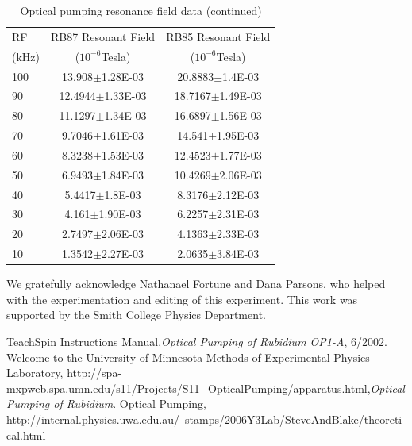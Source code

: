 \documentclass[prb,preprint]{revtex4-1}
\begin{document}
\vspace*{-5cm}
\begin{table}[h]
\centering
\caption{Optical pumping resonance field data (continued)}
\begin{ruledtabular}
\begin{tabular}{ l c c}
RF & RB87 Resonant Field & RB85 Resonant Field\\
(kHz) & ($10^{-6}$Tesla) & ($10^{-6}$Tesla)\\
\hline
100 & 13.908$\pm$1.28E-03 & 20.8883$\pm$1.4E-03\\
90 & 12.4944$\pm$1.33E-03 & 18.7167$\pm$1.49E-03\\
80 & 11.1297$\pm$1.34E-03 & 16.6897$\pm$1.56E-03\\
70 & 9.7046$\pm$1.61E-03 & 14.541$\pm$1.95E-03\\
60 & 8.3238$\pm$1.53E-03 & 12.4523$\pm$1.77E-03\\
50 & 6.9493$\pm$1.84E-03 & 10.4269$\pm$2.06E-03\\
40 & 5.4417$\pm$1.8E-03 & 8.3176$\pm$2.12E-03\\
30 & 4.161$\pm$1.90E-03 & 6.2257$\pm$2.31E-03\\
20 &	2.7497$\pm$2.06E-03 & 4.1363$\pm$2.33E-03\\
10 &	1.3542$\pm$2.27E-03 & 2.0635$\pm$3.84E-03\\
\end{tabular}
\end{ruledtabular}
\label{data2}
\end{table}


\clearpage

\begin{acknowledgments}

We gratefully acknowledge Nathanael Fortune and Dana Parsons, who helped with the experimentation and editing of this experiment.  This work was supported by the Smith College Physics Department.

\end{acknowledgments}


\begin{thebibliography}{99}

 TeachSpin Instructions Manual,\textit{Optical Pumping of Rubidium OP1-A}, 6/2002.
 Welcome to the University of Minnesota Methods of Experimental Physics Laboratory, http://spa-mxpweb.spa.umn.edu/s11/Projects/S11\_OpticalPumping/apparatus.html,\textit{Optical Pumping of Rubidium}.
 Optical Pumping, http://internal.physics.uwa.edu.au/~stamps/2006Y3Lab/SteveAndBlake/theoretical.html

\end{thebibliography}

\end{document}
